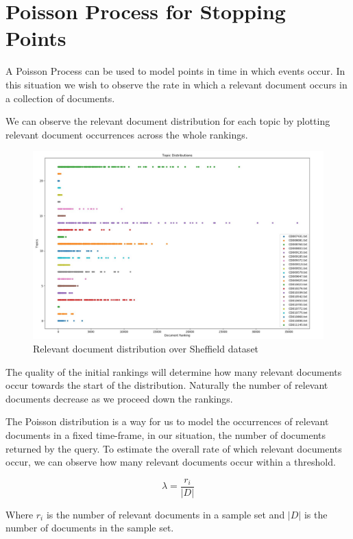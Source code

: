 \section{Poisson Process for Stopping Points} \label{window_samp}

A Poisson Process can be used to model points in time in which events occur. In this situation we wish to observe the rate in which a relevant document occurs in a collection of documents.

We can observe the relevant document distribution for each topic by plotting relevant document occurrences across the whole rankings.


\begin{figure}[H]
\center
\includegraphics[width=15cm]{figures/distrib.jpg}
\caption{Relevant document distribution over Sheffield dataset}
\end{figure}

The quality of the initial rankings will determine how many relevant documents occur towards the start of the distribution. Naturally the number of relevant documents decrease as we proceed down the rankings.

The Poisson distribution is a way for us to model the occurrences of relevant documents in a fixed time-frame, in our situation, the number of documents returned by the query. To estimate the overall rate of which relevant documents occur, we can observe how many relevant documents occur within a threshold.


\begin{equation}
	  \lambda = \frac{r_i}{|D|}
\end{equation}

Where $r_i$ is the number of relevant documents in a sample set and $|D|$ is the number of documents in the sample set.

